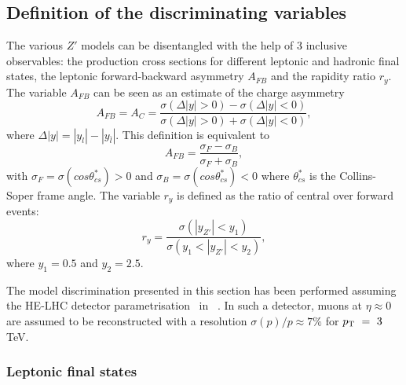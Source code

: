 \subsection{Definition of the discriminating variables}
\label{par:vardef}

The various $Z'$ models can be disentangled with the help of 3 inclusive observables: the production cross sections for different leptonic and hadronic final states, the leptonic forward-backward asymmetry $A_{FB}$ and the rapidity ratio $r_y$. The variable $A_{FB}$ can be seen as an estimate of the charge asymmetry
\begin{equation}
A_{FB} = A_C =  \frac{\sigma(\Delta|y| > 0) - \sigma(\Delta|y| < 0)}{\sigma(\Delta|y| > 0) + \sigma(\Delta|y| < 0)},
\end{equation}
where $\Delta|y| = |y_l| - |y_{\bar{l}}|$. This definition is equivalent to
\begin{equation}
A_{FB} = \frac{\sigma_F - \sigma_B}{\sigma_F + \sigma_B},
\end{equation}
with $\sigma_F = \sigma (cos\theta^{*}_{cs})>0$ and $\sigma_B = \sigma (cos\theta^{*}_{cs})<0$ where $\theta^*_{cs}$ is the Collins-Soper frame angle. The variable $r_y$ is defined as the ratio of central over forward events:
\begin{equation}
r_y = \frac{\sigma(|y_{Z'}| < y_1)}{\sigma(y_1 < |y_{Z'}| <y_2)},
\end{equation}
where $y_1=0.5$ and $y_2=2.5$.


The model discrimination presented in this section has been performed assuming the HE-LHC detector parametrisation~\cite{hlhelhc_web} in \delphes~\cite{deFavereau:2013fsa}. In such a detector, muons at $\eta \approx 0$ are assumed to be reconstructed with a resolution $\sigma(p)/p \approx 7\%$ for $p_{\text{T}}~=~3$\,TeV.

\subsubsection{Leptonic final states}
\label{par:lepana}

